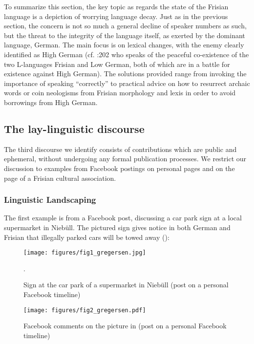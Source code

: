 \documentclass[output=paper]{langsci/langscibook}
\begin{document}
To summarize this section, the key topic as regards the state of the Frisian language is a depiction of worrying language decay. Just as in the previous section, the concern is not so much a general decline of speaker numbers as such, but the threat to the integrity of the language itself, as exerted by the dominant language, German. The main focus is on lexical changes, with the enemy clearly identified as High German (cf. \citealt{Arhammar1973}:202 who speaks of the peaceful co-existence of the two L-languages Frisian and Low German, both of which are in a battle for existence against High German). The solutions provided range from invoking the importance of speaking “correctly” to practical advice on how to resurrect archaic words or coin neologisms from Frisian morphology and lexis in order to avoid borrowings from High German.

\subsection{The lay-linguistic discourse}
\label{sec:gregersen:5.3}

The third discourse we identify consists of contributions which are public and ephemeral, without undergoing any formal publication processes. We restrict our discussion to examples from Facebook postings on personal pages and on the page of a Frisian cultural association. 

\subsubsection{Linguistic Landscaping}
\label{sec:gregersen:5.3.1}

The first example is from a Facebook post, discussing a car park sign at a local supermarket in Niebüll. The pictured sign gives notice in both German and Frisian that illegally parked cars will be towed away ():


\begin{figure}
\texttt{[image: figures/fig1\_gregersen.jpg]}
\caption{Sign at the car park of a supermarket in Niebüll (post on a personal Facebook timeline)}\label{fig:gregersen:1}.
\end{figure}
 

\begin{figure}
\texttt{[image: figures/fig2\_gregersen.pdf]}
\caption{Facebook comments on the picture in  (post on a personal Facebook timeline)}\label{fig:gregersen:2}
\end{figure}
\end{document}

